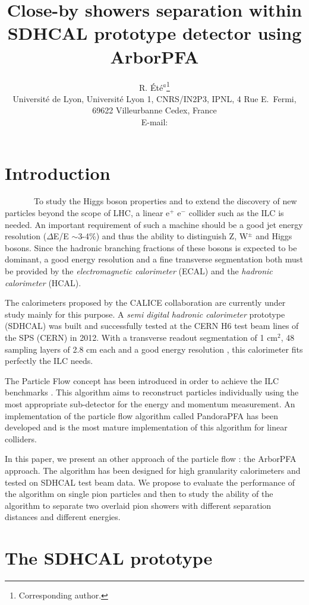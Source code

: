 \documentclass[cits]{JINST}
\title{Close-by showers separation within SDHCAL prototype detector using ArborPFA}
\author{R. \'Et\'e$^a$\thanks{Corresponding author.} \\%
\llap{$^a$} Universit\'e de Lyon, Universit\'e Lyon 1, CNRS/IN2P3, 
 IPNL, 4 Rue E.~Fermi, 69622 Villeurbanne Cedex, France\\
 
 
 E-mail: \email{rete@ipnl.in2p3.fr}
 }
\begin{document}

\newpage
\section{Introduction}

~~~~~~~To study the Higgs boson properties and to extend the discovery of new particles beyond the scope of LHC, a linear e$^+$ e$^-$ collider such as the ILC is needed. An important requirement of such a machine should be a good jet energy resolution ($\Delta$E/E $\sim$3-4\%) and thus the ability to distinguish Z, W$^{\pm}$ and Higgs bosons. Since the hadronic branching fractions of these bosons is expected to be dominant, a good energy resolution and a fine transverse segmentation both must be provided by the \textit{electromagnetic calorimeter} (ECAL) and the \textit{hadronic calorimeter} (HCAL).

The calorimeters proposed by the CALICE collaboration are currently under study mainly for this purpose. A \textit{semi digital hadronic calorimeter} prototype (SDHCAL) was built \cite{sdhcal-paper} and successfully tested at the CERN H6 test beam lines of the SPS (CERN) in 2012. With a transverse readout segmentation of 1 cm$^2$, 48 sampling layers of 2.8 cm each and a good energy resolution \cite{sdhcal-paper}, this calorimeter fits perfectly the ILC needs. 

The Particle Flow concept has been introduced in order to achieve the ILC benchmarks \cite{ilc-tdr}. This algorithm aims to reconstruct particles individually using the most appropriate sub-detector for the energy and momentum measurement. An implementation of the particle flow algorithm called PandoraPFA has been developed \cite{pandora-pfa} and is the most mature implementation of this algorithm for linear colliders.

In this paper, we present an other approach of the particle flow : the ArborPFA approach. The algorithm has been designed for high granularity calorimeters and tested on SDHCAL test beam data. We propose to evaluate the performance of the algorithm on single pion particles and then to study the ability of the algorithm to separate two overlaid pion showers with different separation distances and different energies.

\newpage
\section{The SDHCAL prototype}
\end{document}
